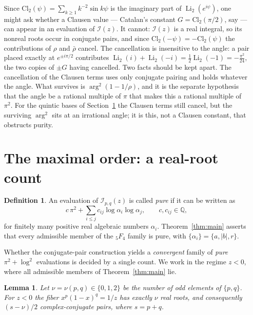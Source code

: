 \documentclass[11pt]{article}
\newtheorem{lemma}[theorem]{Lemma}
\theoremstyle{definition}
\newtheorem{definition}[theorem]{Definition}
\DeclareMathOperator{\Li}{Li}
\newcommand{\Q}{\mathbb{Q}}
\begin{document}
Since $\mathrm{Cl}_2(\psi)=\sum_{k\ge1}k^{-2}\sin k\psi$ is the imaginary part of $\Li_2(e^{i\psi})$,
one might ask whether a Clausen value --- Catalan's constant $G=\mathrm{Cl}_2(\pi/2)$, say --- can
appear in an evaluation of $\mathcal{I}(z)$. It cannot: $\mathcal{I}(z)$ is a real integral, so its
nonreal roots occur in conjugate pairs, and since $\mathrm{Cl}_2(-\psi)=-\mathrm{Cl}_2(\psi)$ the
contributions of $\rho$ and $\bar\rho$ cancel. The cancellation is insensitive to the angle: a pair
placed exactly at $e^{\pm i\pi/2}$ contributes
$\Li_2(i)+\Li_2(-i)=\tfrac12\Li_2(-1)=-\tfrac{\pi^2}{24}$, the two copies of $\pm G$ having cancelled.
Two facts should be kept apart. The cancellation of the Clausen terms uses only conjugate pairing
and holds whatever the angle. What survives is $\arg^2(1-1/\rho)$, and it is the separate
hypothesis that the angle be a rational multiple of $\pi$ that makes this a rational multiple of
$\pi^2$. For the quintic bases of Section~\ref{sec:boundary} the Clausen terms still cancel, but the
surviving $\arg^2$ sits at an irrational angle; it is this, not a Clausen constant, that obstructs
purity.

\section{The maximal order: a real-root count}\label{sec:boundary}

\begin{definition}\label{def:pure}
An evaluation of $\mathcal{I}_{p,q}(z)$ is called \emph{pure} if it can be written as
\[
  c\,\pi^2+\sum_{i\le j}c_{ij}\log\alpha_i\log\alpha_j,
  \qquad c,c_{ij}\in\Q,
\]
for finitely many positive real algebraic numbers $\alpha_i$. Theorem~\ref{thm:main} asserts that
every admissible member of the ${}_5F_4$ family is pure, with $\{\alpha_i\}=\{a,|b|,r\}$.
\end{definition}

Whether the conjugate-pair construction yields a \emph{convergent} family of \emph{pure}
$\pi^2+\log^2$ evaluations is decided by a single count. We work in the regime $z<0$, where all
admissible members of Theorem~\ref{thm:main} lie.

\begin{lemma}\label{lem:realcount}
Let $\nu=\nu(p,q)\in\{0,1,2\}$ be the number of odd elements of $\{p,q\}$. For $z<0$ the fiber
$x^p(1-x)^q=1/z$ has exactly $\nu$ real roots, and consequently $(s-\nu)/2$ complex-conjugate pairs,
where $s=p+q$.
\end{lemma}
\end{document}
